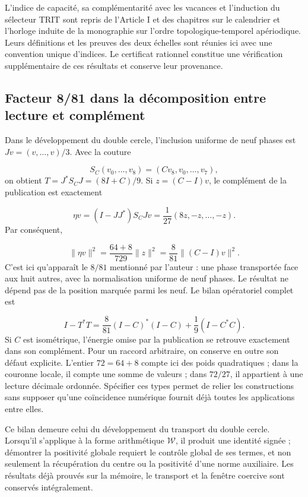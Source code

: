 L'indice de capacité, sa complémentarité avec les vacances et l'induction du sélecteur TRIT sont repris de l'Article I et des chapitres sur le calendrier et l'horloge induite de la monographie sur l'ordre topologique-temporel apériodique. Leurs définitions et les preuves des deux échelles sont réunies ici avec une convention unique d'indices. Le certificat rationnel constitue une vérification supplémentaire de ces résultats et conserve leur provenance.



\subsection{Facteur 8/81 dans la décomposition entre lecture et complément}
Dans le développement du double cercle, l'inclusion uniforme de neuf phases est \(Jv=(v,\ldots,v)/3\). Avec la couture

\[
S_C(v_0,\ldots,v_8)=(Cv_8,v_0,\ldots,v_7),
\]
on obtient \(T=J^*S_CJ=(8I+C)/9\). Si \(z=(C-I)v\), le complément de la publication est exactement

\[
\eta v=(I-JJ^*)S_CJv=\frac1{27}(8z,-z,\ldots,-z).
\]
Par conséquent,

\[
\|\eta v\|^2=\frac{64+8}{729}\|z\|^2
=\frac8{81}\|(C-I)v\|^2.
\]
C'est ici qu'apparaît le \(8/81\) mentionné par l'auteur : une phase transportée face aux huit autres, avec la normalisation uniforme de neuf phases. Le résultat ne dépend pas de la position marquée parmi les neuf. Le bilan opératoriel complet est

\[
I-T^*T=\frac8{81}(I-C)^*(I-C)+\frac19(I-C^*C).
\]
Si \(C\) est isométrique, l'énergie omise par la publication se retrouve exactement dans son complément. Pour un raccord arbitraire, on conserve en outre son défaut explicite. L'entier \(72=64+8\) compte ici des poids quadratiques ; dans la couronne locale, il compte une somme de valeurs ; dans \(72/27\), il appartient à une lecture décimale ordonnée. Spécifier ces types permet de relier les constructions sans supposer qu'une coïncidence numérique fournit déjà toutes les applications entre elles.

Ce bilan demeure celui du développement du transport du double cercle. Lorsqu'il s'applique à la forme arithmétique \(\mathscr W\), il produit une identité signée ; démontrer la positivité globale requiert le contrôle global de ses termes, et non seulement la récupération du centre ou la positivité d'une norme auxiliaire. Les résultats déjà prouvés sur la mémoire, le transport et la fenêtre coercive sont conservés intégralement.

